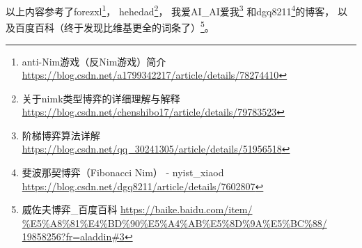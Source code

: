 以上内容参考了forezxl\footnote{anti-Nim游戏（反Nim游戏）简介
	\url{https://blog.csdn.net/a1799342217/article/details/78274410}}，
hehedad\footnote{关于nimk类型博弈的详细理解与解释
	\url{https://blog.csdn.net/chenshibo17/article/details/79783523}}，
我爱AI\_AI爱我\footnote{阶梯博弈算法详解
	\url{https://blog.csdn.net/qq\_30241305/article/details/51956518}}
和dgq8211\footnote{
	斐波那契博弈（Fibonacci Nim） - nyist\_xiaod
	\url{https://blog.csdn.net/dgq8211/article/details/7602807}
}的博客，
以及百度百科（终于发现比维基更全的词条了）\footnote{
	威佐夫博弈\_百度百科
	\url{https://baike.baidu.com/item/
		\%E5\%A8\%81\%E4\%BD\%90\%E5\%A4\%AB\%E5\%8D\%9A\%E5\%BC\%88/
		19858256?fr=aladdin\#3}
}。
